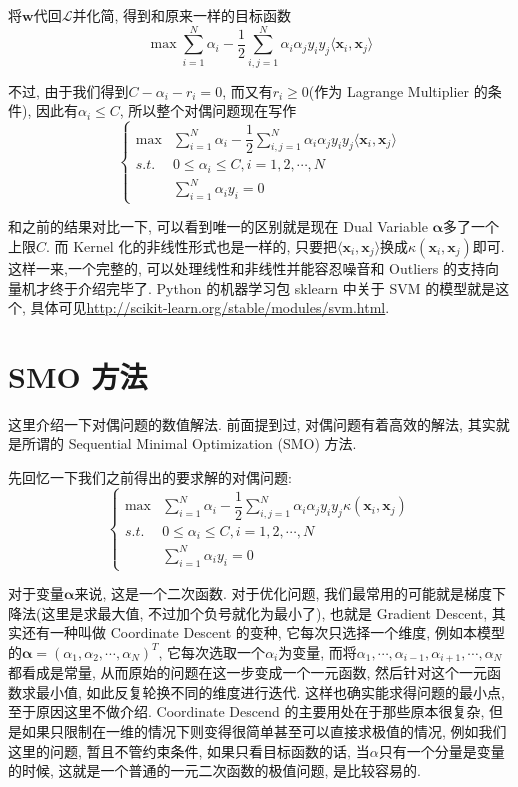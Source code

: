 \documentclass[a4paper,UTF8]{ctexart}
\theoremstyle{plain} \newtheorem{theorem}{定理}[section]
\theoremstyle{plain} \newtheorem{definition}{定义}[section]
\theoremstyle{plain} \newtheorem{lemma}{引理}[section]
\theoremstyle{plain} \newtheorem{proposition}{命题}[section]
\theoremstyle{plain} \newtheorem{example}{例}
\theoremstyle{plain} \newtheorem{remark}{注}
\theoremstyle{plain} \newtheorem{corollary}{推论}[section]
\begin{document}
将$\bm{w}$代回$\mathcal{L}$并化简, 得到和原来一样的目标函数
\begin{equation*}
\max \sum_{i=1}^{N} \alpha_{i} - \frac{1}{2} \sum_{i,j=1}^{N} \alpha_{i} \alpha_{j} y_{i} y_{j} \langle \bm{x}_{i}, \bm{x}_{j} \rangle
\end{equation*}

不过, 由于我们得到$C - \alpha_{i} - r_{i} = 0$, 而又有$r_{i} \geqslant 0$(作为 Lagrange Multiplier 的条件), 因此有$\alpha_{i} \leqslant C$, 所以整个对偶问题现在写作
$$
\begin{cases}
\max & \sum\limits_{i=1}^{N} \alpha_{i} - \dfrac{1}{2} \sum\limits_{i,j=1}^{N} \alpha_{i} \alpha_{j} y_{i} y_{j} \langle \bm{x}_{i}, \bm{x}_{j} \rangle \\ 
s.t. & 0 \leqslant \alpha_{i} \leqslant C ,i = 1,2,\cdots,N \\ 
\quad & \sum\limits_{i=1}^{N} \alpha_{i} y_{i} = 0
\end{cases}
$$

和之前的结果对比一下, 可以看到唯一的区别就是现在 Dual Variable $\bm{\alpha}$多了一个上限$C$. 而 Kernel 化的非线性形式也是一样的, 只要把$\langle \bm{x}_i,\bm{x}_j \rangle$换成$\kappa (\bm{x}_i,\bm{x}_j)$即可. 这样一来,一个完整的, 可以处理线性和非线性并能容忍噪音和 Outliers 的支持向量机才终于介绍完毕了. Python 的机器学习包 sklearn 中关于 SVM 的模型就是这个, 具体可见\url{http://scikit-learn.org/stable/modules/svm.html}.



\section{SMO 方法}
这里介绍一下对偶问题的数值解法. 前面提到过, 对偶问题有着高效的解法, 其实就是所谓的 Sequential Minimal Optimization (SMO) 方法.

先回忆一下我们之前得出的要求解的对偶问题:
$$
\begin{cases}
\max & \sum\limits_{i=1}^{N} \alpha_{i} - \dfrac{1}{2} \sum\limits_{i,j=1}^{N} \alpha_{i} \alpha_{j} y_{i} y_{j} \kappa (\bm{x}_{i}, \bm{x}_{j} ) \\ 
s.t. & 0 \leqslant \alpha_{i} \leqslant C ,i = 1,2,\cdots,N \\ 
\quad & \sum\limits_{i=1}^{N} \alpha_{i} y_{i} = 0
\end{cases}
$$

对于变量$\bm{\alpha}$来说, 这是一个二次函数. 对于优化问题, 我们最常用的可能就是梯度下降法(这里是求最大值, 不过加个负号就化为最小了), 也就是 Gradient Descent, 其实还有一种叫做 Coordinate Descent 的变种, 它每次只选择一个维度, 例如本模型的$\bm{\alpha} = (\alpha_1,\alpha_2,\cdots,\alpha_N)^{T}$, 它每次选取一个$\alpha_{i}$为变量, 而将$\alpha_1,\cdots,\alpha_{i-1},\alpha_{i+1},\cdots,\alpha_{N}$都看成是常量, 从而原始的问题在这一步变成一个一元函数, 然后针对这个一元函数求最小值, 如此反复轮换不同的维度进行迭代. 这样也确实能求得问题的最小点, 至于原因这里不做介绍. Coordinate Descend 的主要用处在于那些原本很复杂, 但是如果只限制在一维的情况下则变得很简单甚至可以直接求极值的情况, 例如我们这里的问题, 暂且不管约束条件, 如果只看目标函数的话, 当$\alpha$只有一个分量是变量的时候, 这就是一个普通的一元二次函数的极值问题, 是比较容易的.
\end{document}
